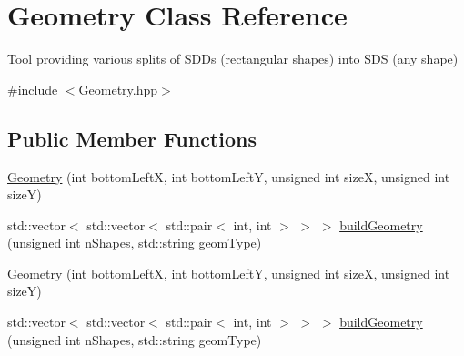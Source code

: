 \hypertarget{classGeometry}{}\section{Geometry Class Reference}
\label{classGeometry}


Tool providing various splits of S\+D\+Ds (rectangular shapes) into S\+DS (any shape)  




{\ttfamily \#include $<$Geometry.\+hpp$>$}

\subsection*{Public Member Functions}
\begin{DoxyCompactItemize}
\item 
\hyperlink{classGeometry_ac7e6a2114a9969257aa18147575cd2fb}{Geometry} (int bottom\+LeftX, int bottom\+LeftY, unsigned int sizeX, unsigned int sizeY)
\item 
std\+::vector$<$ std\+::vector$<$ std\+::pair$<$ int, int $>$ $>$ $>$ \hyperlink{classGeometry_a64fa42fab5fe0c5e9bb7d960bafa55fd}{build\+Geometry} (unsigned int n\+Shapes, std\+::string geom\+Type)
\item 
\hyperlink{classGeometry_ac7e6a2114a9969257aa18147575cd2fb}{Geometry} (int bottom\+LeftX, int bottom\+LeftY, unsigned int sizeX, unsigned int sizeY)
\item 
std\+::vector$<$ std\+::vector$<$ std\+::pair$<$ int, int $>$ $>$ $>$ \hyperlink{classGeometry_aad1f3c4e6930c4dc26d82b000cecd5eb}{build\+Geometry} (unsigned int n\+Shapes, std\+::string geom\+Type)
\end{DoxyCompactItemize}
